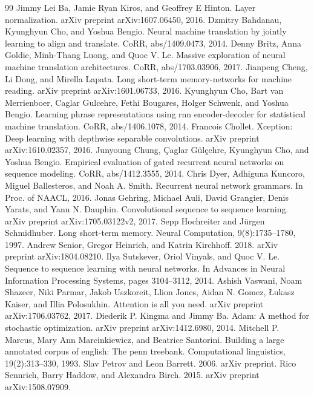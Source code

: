 \documentclass[conference]{IEEEtran}
\begin{document}
\begin{thebibliography}{99}
 Jimmy Lei Ba, Jamie Ryan Kiros, and Geoffrey E Hinton. Layer normalization. arXiv preprint arXiv:1607.06450, 2016.
 Dzmitry Bahdanau, Kyunghyun Cho, and Yoshua Bengio. Neural machine translation by jointly learning to align and translate. CoRR, abs/1409.0473, 2014.
 Denny Britz, Anna Goldie, Minh-Thang Luong, and Quoc V. Le. Massive exploration of neural machine translation architectures. CoRR, abs/1703.03906, 2017.
 Jianpeng Cheng, Li Dong, and Mirella Lapata. Long short-term memory-networks for machine reading. arXiv preprint arXiv:1601.06733, 2016.
 Kyunghyun Cho, Bart van Merrienboer, Caglar Gulcehre, Fethi Bougares, Holger Schwenk, and Yoshua Bengio. Learning phrase representations using rnn encoder-decoder for statistical machine translation. CoRR, abs/1406.1078, 2014.
 Francois Chollet. Xception: Deep learning with depthwise separable convolutions. arXiv preprint arXiv:1610.02357, 2016.
 Junyoung Chung, Çaglar Gülçehre, Kyunghyun Cho, and Yoshua Bengio. Empirical evaluation of gated recurrent neural networks on sequence modeling. CoRR, abs/1412.3555, 2014.
 Chris Dyer, Adhiguna Kuncoro, Miguel Ballesteros, and Noah A. Smith. Recurrent neural network grammars. In Proc. of NAACL, 2016.
 Jonas Gehring, Michael Auli, David Grangier, Denis Yarats, and Yann N. Dauphin. Convolutional sequence to sequence learning. arXiv preprint arXiv:1705.03122v2, 2017.
 Sepp Hochreiter and Jürgen Schmidhuber. Long short-term memory. Neural Computation, 9(8):1735–1780, 1997.
 Andrew Senior, Gregor Heinrich, and Katrin Kirchhoff. 2018. arXiv preprint arXiv:1804.08210.
 Ilya Sutskever, Oriol Vinyals, and Quoc V. Le. Sequence to sequence learning with neural networks. In Advances in Neural Information Processing Systems, pages 3104–3112, 2014.
 Ashish Vaswani, Noam Shazeer, Niki Parmar, Jakob Uszkoreit, Llion Jones, Aidan N. Gomez, Łukasz Kaiser, and Illia Polosukhin. Attention is all you need. arXiv preprint arXiv:1706.03762, 2017.
 Diederik P. Kingma and Jimmy Ba. Adam: A method for stochastic optimization. arXiv preprint arXiv:1412.6980, 2014.
 Mitchell P. Marcus, Mary Ann Marcinkiewicz, and Beatrice Santorini. Building a large annotated corpus of english: The penn treebank. Computational linguistics, 19(2):313–330, 1993.
 Slav Petrov and Leon Barrett. 2006. arXiv preprint.
 Rico Sennrich, Barry Haddow, and Alexandra Birch. 2015. arXiv preprint arXiv:1508.07909.

\end{thebibliography}
\end{document}
